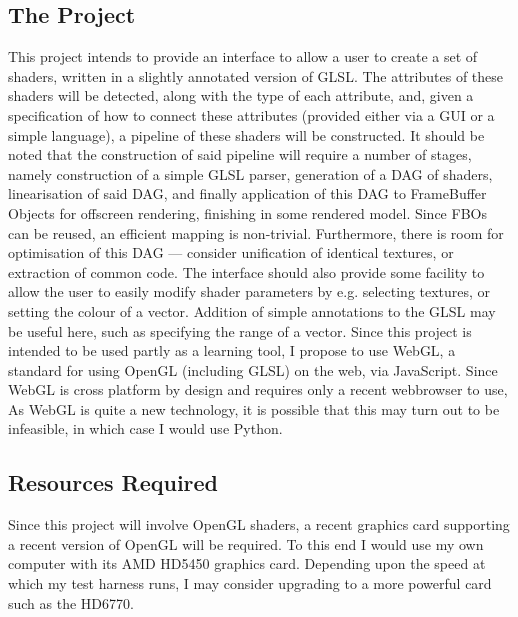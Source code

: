 \subsection*{The Project}
This project intends to provide an interface to allow a user to create a set of shaders, written in a
slightly annotated version of GLSL. The attributes of these shaders will be detected, along with the
type of each attribute, and, given a specification of how to connect these attributes (provided either
via a GUI or a simple language), a pipeline of these shaders will be constructed.
It should be noted that the construction of said pipeline will require a number of stages, namely
construction of a simple GLSL parser, generation of a DAG of shaders, linearisation of said DAG,
and finally application of this DAG to FrameBuffer Objects for offscreen rendering, finishing in
some rendered model. Since FBOs can be reused, an efficient mapping is non-trivial. Furthermore,
there is room for optimisation of this DAG --- consider unification of identical textures, or extraction
of common code.
The interface should also provide some facility to allow the user to easily modify shader parameters
by e.g. selecting textures, or setting the colour of a vector. Addition of simple annotations to the
GLSL may be useful here, such as specifying the range of a vector.
Since this project is intended to be used partly as a learning tool, I propose to use WebGL, a
standard for using OpenGL (including GLSL) on the web, via JavaScript. Since WebGL is cross
platform by design and requires only a recent webbrowser to use, As WebGL is quite a new
technology, it is possible that this may turn out to be infeasible, in which case I would use Python.

\subsection*{Resources Required}
Since this project will involve OpenGL shaders, a recent graphics card supporting a recent version
of OpenGL will be required. To this end I would use my own computer with its AMD HD5450
graphics card. Depending upon the speed at which my test harness runs, I may consider upgrading
to a more powerful card such as the HD6770.

